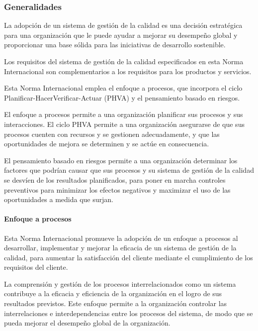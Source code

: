 			\subsubsection{Generalidades}
				\par 
					La adopción de un sistema de gestión de la calidad es una decisión estratégica para una organización
					que le puede ayudar a mejorar su desempeño global y proporcionar una base sólida para las iniciativas
					de desarrollo sostenible.
				
				\par \noindent
					Los requisitos del sistema de gestión de la calidad especificados en esta Norma Internacional son
					complementarios a los requisitos para los productos y servicios.
					
				\par \noindent
					Esta Norma Internacional emplea el enfoque a procesos, que incorpora el ciclo Planificar-HacerVerificar-Actuar (PHVA) y el pensamiento basado en riesgos.
					
				\par \noindent
					El enfoque a procesos permite a una organización planificar sus procesos y sus interacciones.
					El ciclo PHVA permite a una organización asegurarse de que sus procesos cuenten con recursos y se
					gestionen adecuadamente, y que las oportunidades de mejora se determinen y se actúe en consecuencia.
					
				\par \noindent
					El pensamiento basado en riesgos permite a una organización determinar los factores que podrían
					causar que sus procesos y su sistema de gestión de la calidad se desvíen de los resultados planificados,
					para poner en marcha controles preventivos para minimizar los efectos negativos y maximizar el uso
					de las oportunidades a medida que surjan.
					
				\newpage
				\thispagestyle{plain}
					
			\paragraph{Enfoque a procesos}\mbox{}
			
				Esta Norma Internacional promueve la adopción de un enfoque a procesos al desarrollar, implementar
				y mejorar la eficacia de un sistema de gestión de la calidad, para aumentar la satisfacción del cliente
				mediante el cumplimiento de los requisitos del cliente.
			
				\par \noindent	
					La comprensión y gestión de los procesos interrelacionados como un sistema contribuye a la eficacia
					y eficiencia de la organización en el logro de sus resultados previstos. Este enfoque permite a la
					organización controlar las interrelaciones e interdependencias entre los procesos del sistema, de modo
					que se pueda mejorar el desempeño global de la organización.
				
